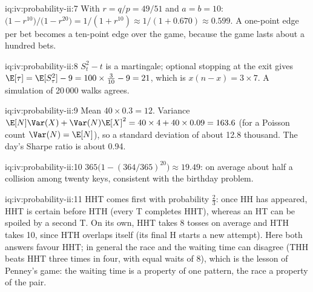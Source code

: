 \begin{solution}{iq:iv:probability-ii:7}
With $r = q/p = 49/51$ and $a = b = 10$: $\big(1 - r^{10}\big)/\big(1 - r^{20}\big) = 1/(1 + r^{10}) \approx 1/(1 +
0.670) \approx 0.599$. A one-point edge per bet becomes a ten-point edge over the game, because the game lasts
about a hundred bets.
\end{solution}

\begin{solution}{iq:iv:probability-ii:8}
$S_t^2 - t$ is a martingale; optional stopping at the exit gives $\E[\tau] = \E[S_\tau^2] - 9 = 100 \times
\tfrac3{10} - 9 = 21$, which is $x(n - x) = 3 \times 7$. A simulation of 20\,000 walks agrees.
\end{solution}

\begin{solution}{iq:iv:probability-ii:9}
Mean $40 \times 0.3 = 12$. Variance $\E[N]\Var(X) + \Var(N)\E[X]^2 = 40 \times 4 + 40 \times 0.09 = 163.6$ (for a
Poisson count $\Var(N) = \E[N]$), so a standard deviation of about 12.8 thousand. The day's Sharpe ratio is about
0.94.
\end{solution}

\begin{solution}{iq:iv:probability-ii:10}
$365\big(1 - (364/365)^{20}\big) \approx 19.49$: on average about half a collision among twenty keys, consistent
with the birthday problem.
\end{solution}

\begin{solution}{iq:iv:probability-ii:11}
HHT comes first with probability $\tfrac23$: once HH has appeared, HHT is certain before HTH (every T completes
HHT), whereas an HT can be spoiled by a second T. On its own, HHT takes 8 tosses on average and HTH takes 10,
since HTH overlaps itself (its final H starts a new attempt). Here both answers favour HHT; in general the race
and the waiting time can disagree (THH beats HHT three times in four, with equal waits of 8), which is the
lesson of Penney's game: the waiting time is a property of one pattern, the race a property of the pair.
\end{solution}

